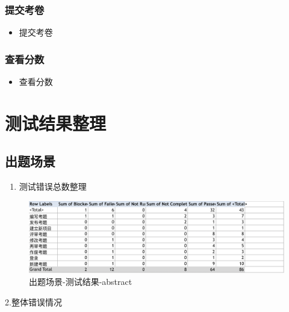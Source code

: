 \documentclass[hyperref, a4paper]{ctexart}
\providecommand{\tightlist}{%
  \setlength{\itemsep}{0pt}\setlength{\parskip}{0pt}}
\begin{document}
\hypertarget{ux63d0ux4ea4ux8003ux5377-1}{%
\subsubsection{提交考卷}\label{ux63d0ux4ea4ux8003ux5377-1}}

\begin{itemize}
\tightlist
\item
  提交考卷
\end{itemize}

\hypertarget{ux67e5ux770bux5206ux6570-1}{%
\subsubsection{查看分数}\label{ux67e5ux770bux5206ux6570-1}}

\begin{itemize}
\tightlist
\item
  查看分数
\end{itemize}

\hypertarget{ux6d4bux8bd5ux7ed3ux679cux6574ux7406}{%
\section{测试结果整理}\label{ux6d4bux8bd5ux7ed3ux679cux6574ux7406}}

\hypertarget{ux51faux9898ux573aux666f-1}{%
\subsection{出题场景}\label{ux51faux9898ux573aux666f-1}}

\begin{enumerate}
\def\labelenumi{\arabic{enumi}.}
\tightlist
\item
  测试错误总数整理
\end{enumerate}

\begin{figure}
\centering
\includegraphics{screenshoots/PivotTable_abstract.png}
\caption{出题场景-测试结果-abstract}
\end{figure}

2.整体错误情况
\end{document}
